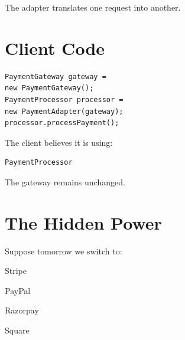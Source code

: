 \documentclass[11pt,a4paper]{book}
\begin{document}

The adapter translates one
request into another.


\section{Client Code}

\begin{verbatim}
PaymentGateway gateway =
new PaymentGateway();
PaymentProcessor processor =
new PaymentAdapter(gateway);
processor.processPayment();
\end{verbatim}


The client believes it is
using:

\begin{verbatim}
PaymentProcessor
\end{verbatim}


The gateway remains unchanged.


\section{The Hidden Power}

Suppose tomorrow we switch to:


Stripe


PayPal


Razorpay


Square

\end{document}
